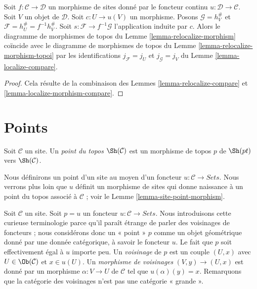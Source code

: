 \begin{lemma}
\label{lemma-relocalize-morphism-compare}
Soit $f : \mathcal{C} \to \mathcal{D}$ un morphisme de sites donné par le
foncteur continu $u : \mathcal{D} \to \mathcal{C}$.
Soit $V$ un objet de $\mathcal{D}$. Soit $c : U \to u(V)$ un morphisme.
Posons $\mathcal{G} = h_V^\#$ et
$\mathcal{F} = h_U^\# = f^{-1}h_V^\#$.
Soit $s : \mathcal{F} \to f^{-1}\mathcal{G}$ l’application induite par $c$.
Alors le diagramme de morphismes de topos du
Lemme \ref{lemma-relocalize-morphism} coïncide avec le diagramme de morphismes
de topos du Lemme \ref{lemma-relocalize-morphism-topoi} par les identifications
$j_\mathcal{F} = j_U$ et $j_\mathcal{G} = j_V$ du
Lemme \ref{lemma-localize-compare}.
\end{lemma}

\begin{proof}
Cela résulte de la combinaison des Lemmes \ref{lemma-relocalize-compare} et
\ref{lemma-localize-morphism-compare}.
\end{proof}















\section{Points}
\label{section-points}

\begin{definition}
\label{definition-point-topos}
Soit $\mathcal{C}$ un site.
Un {\it point du topos $\Sh(\mathcal{C})$} est un morphisme de topos $p$ de
$\Sh(pt)$ vers $\Sh(\mathcal{C})$.
\end{definition}

\noindent
Nous définirons un point d’un site au moyen d’un foncteur
$u : \mathcal{C} \to \textit{Sets}$.
Nous verrons plus loin que $u$ définit un morphisme de sites qui donne
naissance à un point du topos associé à $\mathcal{C}$ ; voir le
Lemme \ref{lemma-site-point-morphism}.

\medskip\noindent
Soit $\mathcal{C}$ un site. Soit $p = u$ un foncteur
$u : \mathcal{C} \to \textit{Sets}$.
Nous introduisons cette curieuse terminologie parce qu’il paraît étrange de
parler des voisinages de foncteurs ; nous considérons donc un « point » $p$
comme un objet géométrique donné par une donnée catégorique, à savoir le
foncteur $u$. Le fait que $p$ soit effectivement égal à $u$ importe peu.
Un {\it voisinage} de $p$ est un couple $(U, x)$ avec
$U \in \Ob(\mathcal{C})$ et $x \in u(U)$.
Un {\it morphisme de voisinages} $(V, y) \to (U, x)$ est donné par un
morphisme $\alpha :V \to U$ de $\mathcal{C}$ tel que
$u(\alpha)(y) = x$. Remarquons que la catégorie des voisinages n’est pas une
catégorie « grande ».

